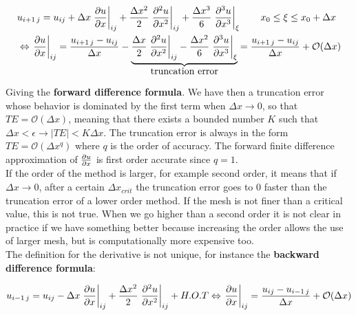 \begin{equation}
\begin{aligned}
&u_{i+1 \, j} = u_{ij}+ \Delta x \left.\frac{\partial u }{\partial x}\right| _{ij}  +\frac{\Delta x^2}{2} \left.\frac{\partial ^2u }{\partial x^2}\right| _{ij}  + \frac{\Delta x^3}{6} \left.\frac{\partial ^3u }{\partial x^3}\right| _{\xi} \qquad x_0 \leq \xi \leq x_0 + \Delta x\\
&\Leftrightarrow \left.\frac{\partial u }{\partial x}\right| _{ij} = \frac{u_{i+1 \, j} - u_{ij}}{\Delta x} -\underbrace{\frac{\Delta x}{2} \left.\frac{\partial ^2u }{\partial x^2}\right| _{ij}  - \frac{\Delta x^2}{6} \left.\frac{\partial ^3u }{\partial x^3}\right| _{\xi}}_{\mbox{truncation error}} = \frac{u_{i+1 \, j} - u_{ij}}{\Delta x} + \mathcal{O}(\Delta x)
\end{aligned}
\end{equation}

Giving the \textbf{forward difference formula}. We have then a truncation error whose behavior is dominated by the first term when $\Delta x \rightarrow 0$, so that $TE = \mathcal{O}(\Delta x)$, meaning that there exists a bounded number $K$ such that $\Delta x < \epsilon \rightarrow |TE| < K\Delta x$. The truncation error is always in the form $TE = \mathcal{O}(\Delta x ^q)$ where $q$ is the order of accuracy. The forward finite difference approximation of $\frac{\partial u }{\partial x}$ is first order accurate since $q = 1$.\\

If the order of the method is larger, for example second order, it means that if $\Delta x\rightarrow 0$, after a certain $\Delta x _{crit}$ the truncation error goes to 0 faster than the truncation error of a lower order method. If the mesh is not finer than a critical value, this is not true. When we go higher than a second order it is not clear in practice if we have something better because increasing the order allows the use of larger mesh, but is computationally more expensive too.\\

The definition for the derivative is not unique, for instance the \textbf{backward difference formula}:

\begin{equation}
u_{i-1 \, j} = u_{ij}- \Delta x \left.\frac{\partial u }{\partial x}\right| _{ij}  +\frac{\Delta x^2}{2} \left.\frac{\partial ^2u }{\partial x^2}\right| _{ij}  + H.O.T \Leftrightarrow \left.\frac{\partial u }{\partial x}\right| _{ij} = \frac{u_{ij} - u_{i-1 \, j}}{\Delta x} + \mathcal{O}(\Delta x)
\end{equation}

